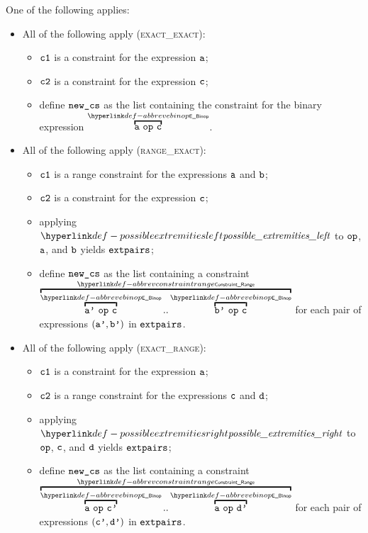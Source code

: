 \ProseParagraph
One of the following applies:
\begin{itemize}
  \item All of the following apply (\textsc{exact\_exact}):
  \begin{itemize}
    \item $\texttt{c1}$ is a constraint for the expression $\texttt{a}$;
    \item $\texttt{c2}$ is a constraint for the expression $\texttt{c}$;
    \item define $\texttt{new\_cs}$ as the list containing the constraint for the binary expression $\AbbrevEBinop{\op}{\va}{\vc}$.
  \end{itemize}

  \item All of the following apply (\textsc{range\_exact}):
  \begin{itemize}
    \item $\texttt{c1}$ is a range constraint for the expressions $\texttt{a}$ and $\texttt{b}$;
    \item $\texttt{c2}$ is a constraint for the expression $\texttt{c}$;
    \item applying $\possibleextremitiesleft$ to $\texttt{op}$, $\texttt{a}$, and $\texttt{b}$ yields $\texttt{extpairs}$;
    \item define $\texttt{new\_cs}$ as the list containing a constraint $\AbbrevConstraintRange{\AbbrevEBinop{\op}{\vap}{\vc}}{\AbbrevEBinop{\op}{\vbp}{\vc}}$
          for each pair of expressions $(\texttt{a'}, \texttt{b'})$ in $\texttt{extpairs}$.
  \end{itemize}

  \item All of the following apply (\textsc{exact\_range}):
  \begin{itemize}
    \item $\texttt{c1}$ is a constraint for the expression $\texttt{a}$;
    \item $\texttt{c2}$ is a range constraint for the expressions $\texttt{c}$ and $\texttt{d}$;
    \item applying $\possibleextremitiesright$ to $\texttt{op}$, $\texttt{c}$, and $\texttt{d}$ yields $\texttt{extpairs}$;
    \item define $\texttt{new\_cs}$ as the list containing a constraint $\AbbrevConstraintRange{\AbbrevEBinop{\op}{\va}{\vcp}}{\AbbrevEBinop{\op}{\va}{\vdp}}$
          for each pair of expressions $(\texttt{c'}, \texttt{d'})$ in $\texttt{extpairs}$.
  \end{itemize}


\end{itemize}
